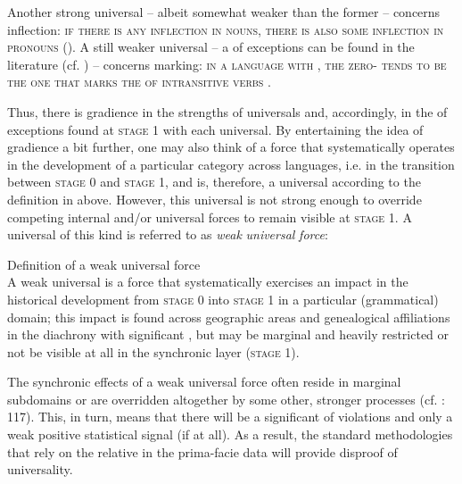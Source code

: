 \documentclass[output=paper]{langsci/langscibook}
\begin{document}
Another strong universal – albeit somewhat weaker than the former – concerns inflection: \textsc{if there is any inflection in nouns, there is also some inflection in pronouns} (\citealt{Moravcsik1993_Gov,Plank2002ff_Univ}). A still weaker universal – a  of exceptions can be found in the literature (cf. \citealt{Handschuh2014_S}) – concerns  marking: \textsc{in a language with , the zero-  tends to be the one that marks the  of intransitive verbs} \citep[95]{Greenberg1963}. 

Thus, there is gradience in the strengths of universals and, accordingly, in the  of exceptions found at \textsc{stage 1} with each universal. By entertaining the idea of gradience a bit further, one may also think of a force that systematically operates in the development of a particular category across languages, i.e. in the transition between \textsc{stage} 0 and \textsc{stage} 1, and is, therefore, a universal according to the definition in  above. However, this universal is not strong enough to override competing internal and/or universal forces to remain visible at \textsc{stage} 1. A universal of this kind is referred to as \textit{weak} \textit{universal} \textit{force}\textsc{:} 

\ea\label{ex:serzant:2}
Definition of a weak universal force\\
A weak universal is a force that systematically exercises an impact in the historical development from \textsc{stage 0} into \textsc{stage 1} in a particular (grammatical) domain; this impact is found across geographic areas and genealogical affiliations in the diachrony with significant , but may be marginal and heavily restricted or not be visible at all in the synchronic layer (\textsc{stage 1}).
\z

The synchronic effects of a weak universal force often reside in marginal subdomains or are overridden altogether by some other, stronger processes (cf. \citealt{Bickel2014}: 117). This, in turn, means that there will be a significant  of violations and only a weak positive statistical signal (if at all). As a result, the standard methodologies that rely on the relative  in the prima-facie data will provide disproof of universality. 
\end{document}
